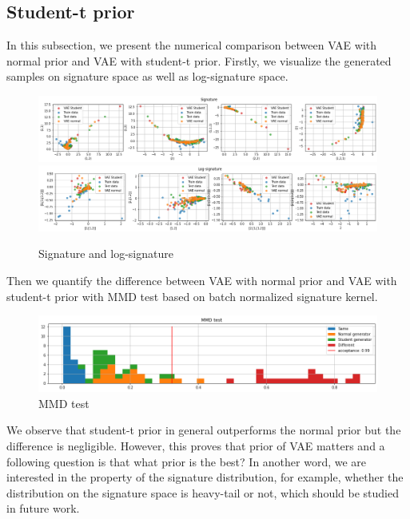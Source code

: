 \documentclass[12pt]{report}
\theoremstyle{definition}
\theoremstyle{remark}
\begin{document}
\subsection{Student-t prior}
In this subsection, we present the numerical comparison between VAE with normal prior and VAE with student-t prior. Firstly, we visualize the generated samples on signature space as well as log-signature space.
\begin{figure}[H]
    \centering
    \includegraphics[width=\textwidth]{figs/cvae26.png}
    \includegraphics[width=\textwidth]{figs/cvae27.png}
    \caption{Signature and log-signature}
\end{figure}
Then we quantify the difference between VAE with normal prior and VAE with student-t prior with MMD test based on batch normalized signature kernel. 
\begin{figure}[H]
    \centering
    \includegraphics[width=\textwidth]{figs/cvae28.png}
    \caption{MMD test}
\end{figure}
We observe that student-t prior in general outperforms the normal prior but the difference is negligible. However, this proves that prior of VAE matters and a following question is that what prior is the best? In another word, we are interested in the property of the signature distribution, for example, whether the distribution on the signature space is heavy-tail or not, which should be studied in future work. 
\end{document}
